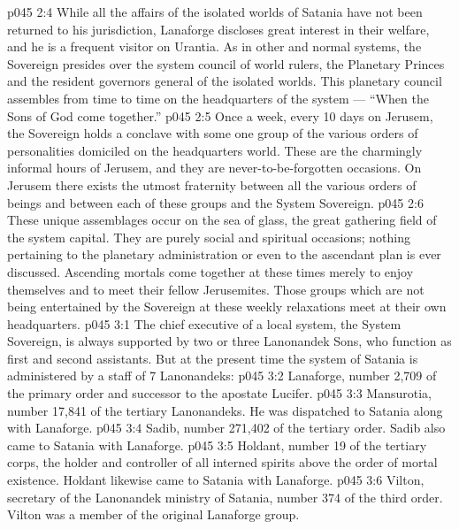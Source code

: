 \vs p045 2:4 \pc While all the affairs of the isolated worlds of Satania have not been returned to his jurisdiction, Lanaforge discloses great interest in their welfare, and he is a frequent visitor on Urantia. As in other and normal systems, the Sovereign presides over the system council of world rulers, the Planetary Princes and the resident governors general of the isolated worlds. This planetary council assembles from time to time on the headquarters of the system --- “When the Sons of God come together.”
\vs p045 2:5 Once a week, every 10 days on Jerusem, the Sovereign holds a conclave with some one group of the various orders of personalities domiciled on the headquarters world. These are the charmingly informal hours of Jerusem, and they are never\hyp{}to\hyp{}be\hyp{}forgotten occasions. On Jerusem there exists the utmost fraternity between all the various orders of beings and between each of these groups and the System Sovereign.
\vs p045 2:6 These unique assemblages occur on the sea of glass, the great gathering field of the system capital. They are purely social and spiritual occasions; nothing pertaining to the planetary administration or even to the ascendant plan is ever discussed. Ascending mortals come together at these times merely to enjoy themselves and to meet their fellow Jerusemites. Those groups which are not being entertained by the Sovereign at these weekly relaxations meet at their own headquarters.
\vs p045 3:1 The chief executive of a local system, the System Sovereign, is always supported by two or three Lanonandek Sons, who function as first and second assistants. But at the present time the system of Satania is administered by a staff of 7 Lanonandeks:
\vs p045 3:2 \bibnobreakspace {} Lanaforge, number 2,709 of the primary order and successor to the apostate Lucifer.
\vs p045 3:3 \bibnobreakspace {} Mansurotia, number 17,841 of the tertiary Lanonandeks. He was dispatched to Satania along with Lanaforge.
\vs p045 3:4 \bibnobreakspace {} Sadib, number 271,402 of the tertiary order. Sadib also came to Satania with Lanaforge.
\vs p045 3:5 \bibnobreakspace {} Holdant, number 19 of the tertiary corps, the holder and controller of all interned spirits above the order of mortal existence. Holdant likewise came to Satania with Lanaforge.
\vs p045 3:6 \bibnobreakspace {} Vilton, secretary of the Lanonandek ministry of Satania, number 374 of the third order. Vilton was a member of the original Lanaforge group.
